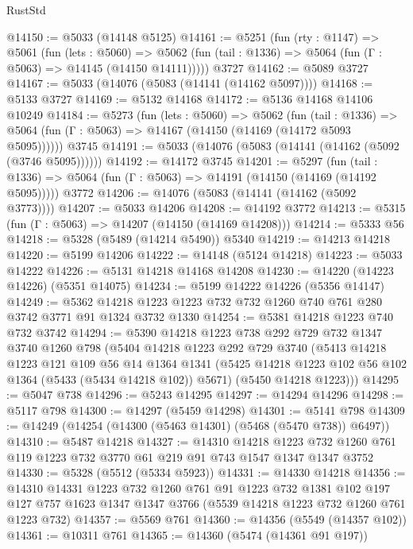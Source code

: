 \begin{lexlean}{RustStd}
\begin{coremodule}
@14150 := @5033 (@14148 @5125)
@14161 := @5251
    (fun (rty : @1147) =>
    @5061
      (fun (lets : @5060) =>
      @5062 (fun (tail : @1336) => @5064 (fun (Γ : @5063) => @14145 (@14150 @14111)))))
    @3727
@14162 := @5089 @3727
@14167 := @5033 (@14076 (@5083 (@14141 (@14162 @5097))))
@14168 := @5133 @3727
@14169 := @5132 @14168
@14172 := @5136 @14168 @14106 @10249
@14184 := @5273
    (fun (lets : @5060) =>
    @5062
      (fun (tail : @1336) =>
      @5064 (fun (Γ : @5063) => @14167 (@14150 (@14169 (@14172 @5093 @5095))))))
    @3745
@14191 := @5033 (@14076 (@5083 (@14141 (@14162 (@5092 (@3746 @5095))))))
@14192 := @14172 @3745
@14201 := @5297
    (fun (tail : @1336) => @5064 (fun (Γ : @5063) => @14191 (@14150 (@14169 (@14192 @5095)))))
    @3772
@14206 := @14076 (@5083 (@14141 (@14162 (@5092 @3773))))
@14207 := @5033 @14206
@14208 := @14192 @3772
@14213 := @5315 (fun (Γ : @5063) => @14207 (@14150 (@14169 @14208)))
@14214 := @5333 @56
@14218 := @5328 (@5489 (@14214 @5490)) @5340
@14219 := @14213 @14218
@14220 := @5199 @14206
@14222 := @14148 (@5124 @14218)
@14223 := @5033 @14222
@14226 := @5131 @14218 @14168 @14208
@14230 := @14220 (@14223 @14226) (@5351 @14075)
@14234 := @5199 @14222 @14226 (@5356 @14147)
@14249 := @5362 @14218 @1223 @1223 @732 @732 @1260 @740 @761 @280 @3742 @3771 @91 @1324 @3732 @1330
@14254 := @5381 @14218 @1223 @740 @732 @3742
@14294 := @5390
    @14218
    @1223
    @738
    @292
    @729
    @732
    @1347
    @3740
    @1260
    @798
    (@5404
      @14218
      @1223
      @292
      @729
      @3740
      (@5413
        @14218
        @1223
        @121
        @109
        @56
        @14
        @1364
        @1341
        (@5425 @14218 @1223 @102 @56 @102 @1364 (@5433 (@5434 @14218 @102)) @5671)
        (@5450 @14218 @1223)))
@14295 := @5047 @738
@14296 := @5243 @14295
@14297 := @14294 @14296
@14298 := @5117 @798
@14300 := @14297 (@5459 @14298)
@14301 := @5141 @798
@14309 := @14249 (@14254 (@14300 (@5463 @14301) (@5468 (@5470 @738)) @6497))
@14310 := @5487 @14218
@14327 := @14310
    @14218
    @1223
    @732
    @1260
    @761
    @119
    @1223
    @732
    @3770
    @61
    @219
    @91
    @743
    @1547
    @1347
    @1347
    @3752
@14330 := @5328 (@5512 (@5334 @5923))
@14331 := @14330 @14218
@14356 := @14310
    @14331
    @1223
    @732
    @1260
    @761
    @91
    @1223
    @732
    @1381
    @102
    @197
    @127
    @757
    @1623
    @1347
    @1347
    @3766
    (@5539 @14218 @1223 @732 @1260 @761 @1223 @732)
@14357 := @5569 @761
@14360 := @14356 (@5549 (@14357 @102))
@14361 := @10311 @761
@14365 := @14360 (@5474 (@14361 @91 @197))

\end{coremodule}
\end{lexlean}
